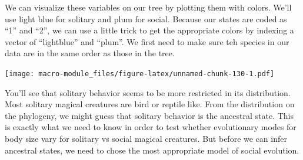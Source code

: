 \documentclass[]{book}
\newenvironment{Shaded}{\begin{snugshade}}{\end{snugshade}}
\newcommand{\KeywordTok}[1]{\textcolor[rgb]{0.13,0.29,0.53}{\textbf{{#1}}}}
\newcommand{\DataTypeTok}[1]{\textcolor[rgb]{0.13,0.29,0.53}{{#1}}}
\newcommand{\DecValTok}[1]{\textcolor[rgb]{0.00,0.00,0.81}{{#1}}}
\newcommand{\FloatTok}[1]{\textcolor[rgb]{0.00,0.00,0.81}{{#1}}}
\newcommand{\StringTok}[1]{\textcolor[rgb]{0.31,0.60,0.02}{{#1}}}
\newcommand{\CommentTok}[1]{\textcolor[rgb]{0.56,0.35,0.01}{\textit{{#1}}}}
\newcommand{\NormalTok}[1]{{#1}}
\theoremstyle{definition}
\theoremstyle{definition}
\theoremstyle{definition}
\theoremstyle{remark}
\begin{document}
We can visualize these variables on our tree by plotting them with
colors. We'll use light blue for solitary and plum for social. Because
our states are coded as ``1'' and ``2'', we can use a little trick to
get the appropriate colors by indexing a vector of ``lightblue'' and
``plum''. We first need to make sure teh species in our data are in the
same order as those in the tree.

\begin{Shaded}
\end{Shaded}

\texttt{[image: macro-module\_files/figure-latex/unnamed-chunk-130-1.pdf]}

You'll see that solitary behavior seems to be more restricted in its
distribution. Most solitary magical creatures are bird or reptile like.
From the distribution on the phylogeny, we might guess that solitary
behavior is the ancestral state. This is exactly what we need to know in
order to test whether evolutionary modes for body size vary for solitary
vs social magical creatures. But before we can infer ancestral states,
we need to chose the most appropriate model of social evolution.
\end{document}
